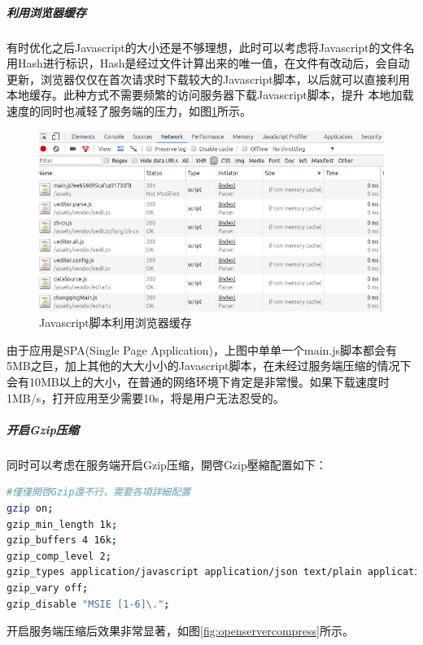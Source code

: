 \documentclass[12pt]{book}
\numberwithin{dummy}{section}
\theoremstyle{ocrenumbox}
\theoremstyle{blacknumex}
\theoremstyle{blacknumbox}
\theoremstyle{ocrenum}
\begin{document}
\subparagraph{利用浏览器缓存}

有时优化之后Javascript的大小还是不够理想，此时可以考虑将Javascript的文件名用Hash进行标识，Hash是经过文件计算出来的唯一值，在文件有改动后，会自动更新，浏览器仅仅在首次请求时下载较大的Javascript脚本，以后就可以直接利用本地缓存。此种方式不需要频繁的访问服务器下载Javascript脚本，提升 本地加载速度的同时也减轻了服务端的压力，如图\ref{fig:scriptusingdiskcache}所示。

\begin{figure}[htbp]
	\centering
	\includegraphics[scale=0.45]{scriptusingdiskcache.png}
	\caption{Javascript脚本利用浏览器缓存}
	\label{fig:scriptusingdiskcache}
\end{figure}

由于应用是SPA(Single Page Application)，上图中单单一个main.js脚本都会有5MB之巨，加上其他的大大小小的Javascript脚本，在未经过服务端压缩的情况下会有10MB以上的大小，在普通的网络环境下肯定是非常慢。如果下载速度时1MB/s，打开应用至少需要10s，将是用户无法忍受的。

\subparagraph{开启Gzip压缩}

同时可以考虑在服务端开启Gzip压缩，開啓Gzip壓縮配置如下：

\begin{lstlisting}[language=Bash]
#僅僅開啓Gzip還不行，需要各項詳細配置
gzip on;
gzip_min_length 1k;
gzip_buffers 4 16k;
gzip_comp_level 2;
gzip_types application/javascript application/json text/plain application/x-javascript text/css application/xml text/javascript application/x-httpd-php image/jpeg image/gif image/png;
gzip_vary off;
gzip_disable "MSIE [1-6]\.";
\end{lstlisting}

开启服务端压缩后效果非常显著，如图\ref{fig:openservercompress}所示。
\end{document}
